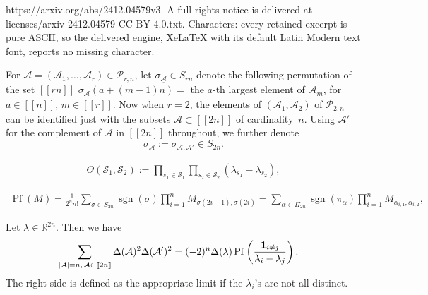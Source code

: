 \documentclass[10pt,a4paper]{amsart}
\newcommand{\Pf}{\operatorname{Pf}}
\newcommand{\R}{{\mathbb R}}
\newcommand{\cA}{\mathcal{A}}
\newcommand{\cP}{{\mathcal P}}
\newcommand{\cS}{\mathcal{S}}
\newcommand{\dd}{\Theta}
\newcommand{\ind}{{\bf{1}}}
\newcommand{\lst}[1]{[\![#1 ]\!]}
\newcommand{\sgn}{\operatorname{sgn}}
\begin{document}
https://arxiv.org/abs/2412.04579v3. A full rights notice is delivered at licenses/arxiv-2412.04579-CC-BY-4.0.txt. Characters: every retained excerpt is pure ASCII, so the delivered engine, XeLaTeX with its default Latin Modern text font, reports no missing character.
\begin{Definition}
 For $\underline{\cA}=(\cA_1,\dots,\cA_r)\in \cP_{r,n}$, let $\sigma_{\underline{\cA}}\in S_{rn}$
 denote the following permutation of the set $\lst{rn}$
$
\sigma_{\underline{\cA}}(a+(m-1)n)= $ the $a$-th largest element of $ \cA_m$, for $a\in \lst{n}$, $ m\in \lst{r}$.
Now when $r=2$, the elements of $(\cA_1, \cA_2)$ of $\cP_{2,n}$ can be identified just with the subsets $\cA\subset \lst{2n}$ of cardinality~$n$. Using $\cA'$ for the complement of $\cA$ in $\lst{2n}$ throughout, we further denote
\begin{equation}
\label{shorthand}
\sigma_{{\cA}} := \sigma_{\cA, \cA'} \in S_{2n}.
\end{equation}

\end{Definition}

\begin{align}\label{eq:defdelta}
 \dd(\cS_1,\cS_2):= \prod_{s_1\in \cS_1} \prod_{s_2\in \cS_2}(\lambda_{s_1}-\lambda_{s_2}),
\end{align}

\begin{align}\label{eq:Pfaffiandef}
 \Pf(M)=\frac{1}{2^n n!} \sum_{\sigma\in S_{2n}} \sgn(\sigma) \prod_{i=1}^n M_{{\sigma(2i-1)},{\sigma(2i)}}
 = \sum_{\alpha\in \Pi_{2n}} \sgn(\pi_\alpha) \prod_{i=1}^n M_{\alpha_{i,1},\alpha_{i,2}},
\end{align}

\begin{Proposition}\label{prop:det2+Pf}
Let ${\lambda}\in \R^{2n}$. Then we have
 \begin{align*}%
 \sum_{|\cA|=n,\, \cA\subset\lst{2n}} \Delta(\cA)^2 \Delta (\cA')^2&=(-2)^n \Delta (\lambda) \Pf\left(\frac{\ind_{i\neq j}}{\lambda_i-\lambda_j}\right).
 \end{align*}
The right side is defined as the appropriate limit if the $\lambda_i$'s are not all distinct.
\end{Proposition}
\end{document}
